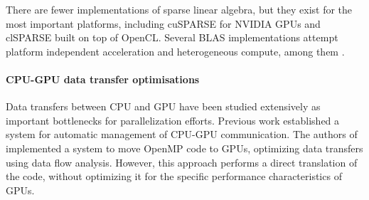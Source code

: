     There are fewer implementations of sparse linear algebra, but they exist for
    the most important platforms, including cuSPARSE \cite{cusparse} for NVIDIA
    GPUs and clSPARSE \cite{clsparse} built on top of OpenCL.
    Several BLAS implementations attempt platform independent acceleration and
    heterogeneous compute, among them \citet{Wang:2016:BHP:2925426.2926256,
    10.1007/978-3-319-64203-1_33, Diego2017Multi}. 


\paragraph*{CPU-GPU data transfer optimisations}

    Data transfers between CPU and GPU have been studied extensively as
    important bottlenecks for parallelization efforts.
    Previous work \cite{Jablin:2011:ACC:1993316.1993516} established a system
    for automatic management of CPU-GPU communication.
    The authors of \cite{Lee:2009:OGC:1594835.1504194} implemented a system to
    move OpenMP code to GPUs, optimizing data transfers using data flow
    analysis.
    However, this approach performs a direct translation of the code, without
    optimizing it for the specific performance characteristics of GPUs.

